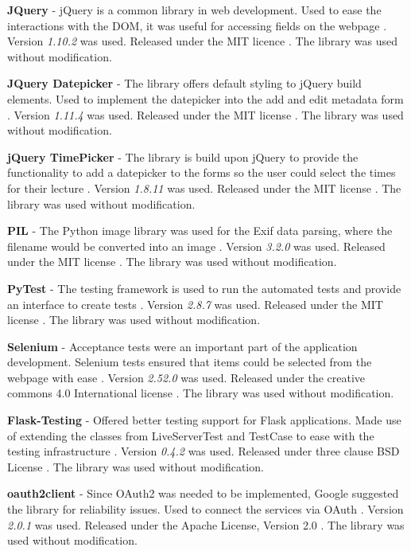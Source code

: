 \textbf{JQuery} - jQuery is a common library in web development. Used to ease the interactions with the DOM, it was useful for accessing fields on the webpage \cite{citeulike:14025897}. Version \textit{1.10.2} was used. Released under the MIT licence \cite{citeulike:14025880}. The library was used without modification.

\textbf{JQuery Datepicker} - The library offers default styling to jQuery build elements. Used to implement the datepicker into the add and edit metadata form \cite{citeulike:14025900}. Version \textit{1.11.4} was used. Released under the MIT license \cite{citeulike:14025880}. The library was used without modification.

\textbf{jQuery TimePicker} - The library is build upon jQuery to provide the functionality to add a datepicker to the forms so the user could select the times for their lecture \cite{citeulike:14004013}. Version \textit{1.8.11} was used. Released under the MIT license \cite{citeulike:14025880}. The library was used without modification.

\textbf{PIL} - The Python image library was used for the Exif data parsing, where the filename would be converted into an image \cite{citeulike:14024992}. Version \textit{3.2.0} was used. Released under the MIT license \cite{citeulike:14025880}. The library was used without modification.

\textbf{PyTest} - The testing framework is used to run the automated tests and provide an interface to create tests \cite{citeulike:14020583}. Version \textit{2.8.7} was used. Released under the MIT license \cite{citeulike:14025880}. The library was used without modification.

\textbf{Selenium} - Acceptance tests were an important part of the application development. Selenium tests ensured that items could be selected from the webpage with ease \cite{citeulike:14020625}. Version \textit{2.52.0} was used. Released under the creative commons 4.0 International license \cite{citeulike:14025914}. The library was used without modification.

\textbf{Flask-Testing} - Offered better testing support for Flask applications. Made use of extending the classes from LiveServerTest and TestCase to ease with the testing infrastructure \cite{citeulike:14020588}. Version \textit{0.4.2} was used. Released under three clause BSD License \cite{citeulike:14025861}. The library was used without modification.

\textbf{oauth2client} - Since OAuth2 was needed to be implemented, Google suggested the library for reliability issues. Used to connect the services via OAuth \cite{citeulike:14025877}. Version \textit{2.0.1} was used. Released under the Apache License, Version 2.0 \cite{apache_license}. The library was used without modification.

